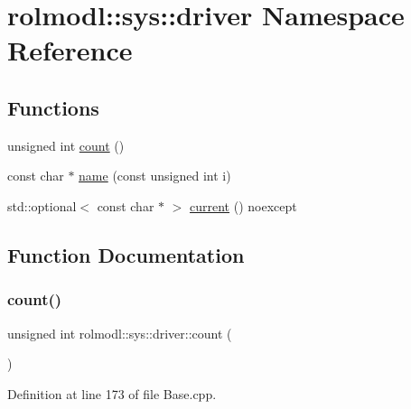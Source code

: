 \hypertarget{namespacerolmodl_1_1sys_1_1driver}{}\section{rolmodl\+::sys\+::driver Namespace Reference}
\label{namespacerolmodl_1_1sys_1_1driver}
\subsection*{Functions}
\begin{DoxyCompactItemize}
\item 
unsigned int \mbox{\hyperlink{namespacerolmodl_1_1sys_1_1driver_a865ed7f0572917341f90cb9c02a13e2f}{count}} ()
\item 
const char $\ast$ \mbox{\hyperlink{namespacerolmodl_1_1sys_1_1driver_a694e500336cf0a5371776be6f2054db5}{name}} (const unsigned int i)
\item 
std\+::optional$<$ const char $\ast$ $>$ \mbox{\hyperlink{namespacerolmodl_1_1sys_1_1driver_a23be225fc51a690fe8d72b86afef5fc8}{current}} () noexcept
\end{DoxyCompactItemize}


\subsection{Function Documentation}
\mbox{\label{namespacerolmodl_1_1sys_1_1driver_a865ed7f0572917341f90cb9c02a13e2f}} 
\subsubsection{\texorpdfstring{count()}{count()}}
{\footnotesize\ttfamily unsigned int rolmodl\+::sys\+::driver\+::count (\begin{DoxyParamCaption}{ }\end{DoxyParamCaption})}



Definition at line 173 of file Base.\+cpp.

\mbox{\label{namespacerolmodl_1_1sys_1_1driver_a23be225fc51a690fe8d72b86afef5fc8}} 
